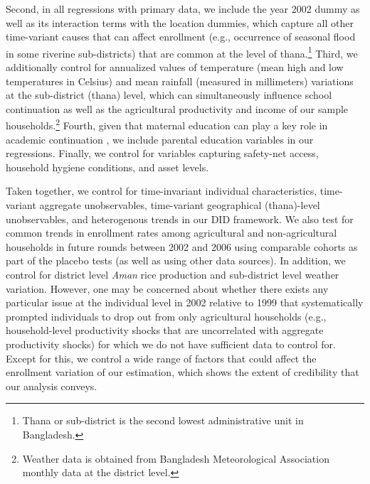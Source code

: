 \documentclass[12pt,letterpaper]{article}
\newcommand{\0}{\ensuremath{\mbox{\boldmath $0$}}}
\begin{document}
Second, in all regressions with primary data, we include the year 2002 dummy as well as its interaction terms with the location dummies, which capture all other time-variant causes that can affect enrollment (e.g., occurrence of seasonal flood in some riverine sub-districts) that are common at the level of thana.\footnote{Thana or sub-district is the second lowest administrative unit in Bangladesh.} Third, we additionally control for annualized values of temperature (mean high and low temperatures in Celsius) and mean rainfall (measured in millimeters) variations at the sub-district (thana) level, which can simultaneously influence school continuation as well as the agricultural productivity and income of our sample households.\footnote{Weather data is obtained from Bangladesh Meteorological Association monthly data at the district level.} Fourth, given that maternal education can play a key role in academic continuation \citep{BFRV1999}, we include parental education variables in our regressions. Finally, we control for variables capturing safety-net access, household hygiene conditions, and asset levels.

Taken together, we control for time-invariant individual characteristics, time-variant aggregate unobservables, time-variant geographical (thana)-level unobservables, and heterogenous trends in our DID framework. We also test for common trends in enrollment rates among agricultural and non-agricultural households in future rounds between 2002 and 2006 using comparable cohorts as part of the placebo tests (as well as using other data sources). In addition, we control for district level \textit{Aman} rice production and sub-district level weather variation. However, one may be concerned about whether there exists any particular issue at the individual level in 2002 relative to 1999 that systematically prompted individuals to drop out from only agricultural households (e.g., household-level productivity shocks that are uncorrelated with aggregate productivity shocks) for which we do not have sufficient data to control for. Except for this, we control a wide range of factors that could affect the enrollment variation of our estimation, which shows the extent of credibility that our analysis conveys.
\end{document}
